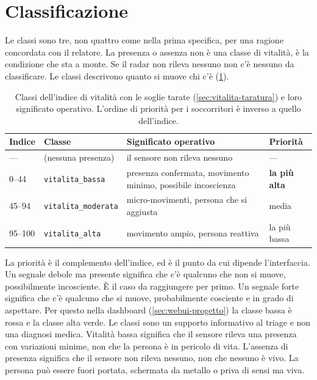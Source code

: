 \section{Classificazione}
\label{sec:vitalita-classi}

Le classi sono tre, non quattro come nella prima specifica, per una ragione
concordata con il relatore. La presenza o assenza non è una classe di vitalità, è la
condizione che sta a monte. Se il radar non rileva nessuno non c'è nessuno da
classificare. Le classi descrivono quanto si muove chi c'è (\cref{tab:vitalita-classi}).

\begin{table}[htbp]
\forcerectofloat
\centering
\caption{Classi dell'indice di vitalità con le soglie tarate
(\cref{sec:vitalita-taratura}) e loro significato operativo. L'ordine di priorità per
i soccorritori è inverso a quello dell'indice.}
\label{tab:vitalita-classi}
\small
\begin{tabularx}{\linewidth}{@{}llXl@{}}
\toprule
\textbf{Indice} & \textbf{Classe} & \textbf{Significato operativo} & \textbf{Priorità} \\
\midrule
--- & (nessuna presenza) & il sensore non rileva nessuno & --- \\
0--44 & \texttt{vitalita\_bassa} & presenza confermata, movimento minimo, possibile
  incoscienza & \textbf{la più alta} \\
45--94 & \texttt{vitalita\_moderata} & micro-movimenti, persona che si aggiusta & media \\
95--100 & \texttt{vitalita\_alta} & movimento ampio, persona reattiva & la più bassa \\
\bottomrule
\end{tabularx}
\end{table}

La priorità è il complemento dell'indice, ed è il punto da cui dipende l'interfaccia.
Un segnale debole ma presente significa che c'è qualcuno che non si muove,
possibilmente incosciente. È il caso da raggiungere per primo. Un segnale forte
significa che c'è qualcuno che si muove, probabilmente cosciente e in grado di
aspettare. Per questo nella dashboard (\cref{sec:webui-progetto}) la classe bassa è
rossa e la classe alta verde. Le classi sono un supporto informativo al triage e non
una diagnosi medica. Vitalità bassa significa che il sensore rileva una presenza con
variazioni minime, non che la persona è in pericolo di vita. L'assenza di presenza
significa che il sensore non rileva nessuno, non che nessuno è vivo. La persona può
essere fuori portata, schermata da metallo o priva di sensi ma viva.

